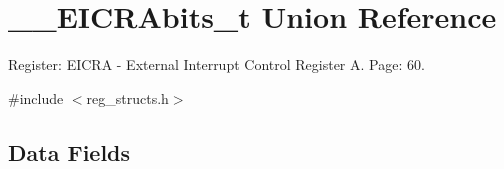 \hypertarget{union_____e_i_c_r_abits__t}{\section{\+\_\+\+\_\+\+E\+I\+C\+R\+Abits\+\_\+t Union Reference}
\label{union_____e_i_c_r_abits__t}
}


Register\+: E\+I\+C\+R\+A -\/ External Interrupt Control Register A. Page\+: 60.  




{\ttfamily \#include $<$reg\+\_\+structs.\+h$>$}

\subsection*{Data Fields}
